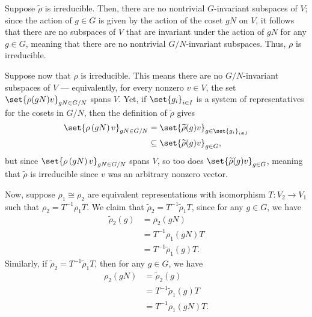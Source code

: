 \documentclass[10pt]{mypackage}
\begin{document}
\begin{solution}
  Suppose $ \widetilde{\rho} $ is irreducible. Then, there are no nontrivial $G$-invariant subspaces of $V$; since the action of $g\in G$ is given by the action of the coset $gN$ on $V$, it follows that there are no subspaces of $V$ that are invariant under the action of $gN$ for any $g\in G$, meaning that there are no nontrivial $G/N$-invariant subspaces. Thus, $ \rho $ is irreducible.

  Suppose now that $\rho$ is irreducible. This means there are no $G/N$-invariant subspaces of $V$ --- equivalently, for every nonzero $v\in V$, the set $\set{\rho(gN)v}_{gN\in G/N}$ spans $V$. Yet, if $\set{g_i}_{i\in I}$ is a system of representatives for the cosets in $G/N$, then the definition of $ \widetilde{\rho} $ gives
  \begin{align*}
    \set{\rho\left( gN \right)v}_{gN\in G/N} &= \set{ \widetilde{\rho}(g)v }_{g\in \set{g_i}_{i\in I}}\\
                                             &\subseteq \set{ \widetilde{\rho}(g)v}_{g\in G},
  \end{align*}
  but since $\set{\rho\left( gN \right)v}_{gN\in G/N}$ spans $V$, so too does $\set{ \widetilde{\rho}(g)v }_{g\in G}$, meaning that $ \widetilde{\rho} $ is irreducible since $v$ was an arbitrary nonzero vector.

  Now, suppose $ \rho_1 \cong \rho_2 $ are equivalent representations with isomorphism $T\colon V_2\rightarrow V_1$ such that $ \rho_2 = T^{-1}\rho_1 T $. We claim that $ \widetilde{\rho}_2 = T^{-1} \widetilde{\rho}_1 T $, since for any $g\in G$, we have
  \begin{align*}
    \widetilde{\rho}_2(g) &= \rho_2\left( gN \right)\\
                          &= T^{-1} \rho_1\left( gN \right) T\\
                          &= T^{-1} \widetilde{\rho}_1(g) T.
  \end{align*}
  Similarly, if $ \widetilde{\rho}_2 = T^{-1}\widetilde{\rho}_1 T $, then for any $g\in G$, we have
  \begin{align*}
    \rho_2(gN) &= \widetilde{\rho}_2(g)\\
               &= T^{-1} \widetilde{\rho}_1(g) T\\
               &= T^{-1} \rho_1\left( gN \right) T.
  \end{align*}
\end{solution}
\end{document}
